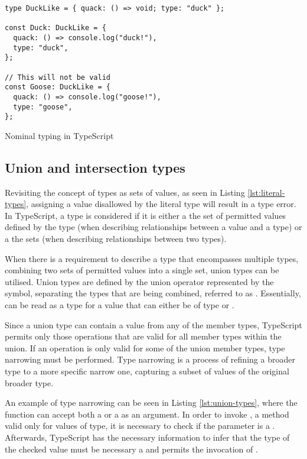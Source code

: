 \begin{listing}[ht]
  \begin{verbatim}
type DuckLike = { quack: () => void; type: "duck" };

const Duck: DuckLike = {
  quack: () => console.log("duck!"),
  type: "duck",
};

// This will not be valid
const Goose: DuckLike = {
  quack: () => console.log("goose!"),
  type: "goose",
};
\end{verbatim}
  \caption{Nominal typing in TypeScript}\label{lst:nominal-types-emulation}
\end{listing}

\subsection{Union and intersection types}\label{sec:union-intersection}

Revisiting the concept of types as sets of values, as seen in Listing \ref{lst:literal-types}, assigning a value disallowed by the literal type will result in a type error. In TypeScript, a type is considered  if it is either a  the set of permitted values defined by the type (when describing relationships between a value and a type) or a  the sets (when describing relationships between two types).

When there is a requirement to describe a type that encompasses multiple types, combining two sets of permitted values into a single set, union types can be utilised. Union types are defined by the union operator represented by the \code{|} symbol, separating the types that are being combined, referred to as  \cite{DocumentationEverydayTypes}. Essentially,  can be read as a type for a value that can either be of type  or .

Since a union type can contain a value from any of the member types, TypeScript permits only those operations that are valid for all member types within the union. If an operation is only valid for some of the union member types, type narrowing must be performed. Type narrowing is a process of refining a broader type to a more specific narrow one, capturing a subset of values of the original broader type.

An example of type narrowing can be seen in Listing \ref{lst:union-types}, where the function  can accept both a  or a  as an argument. In order to invoke , a method valid only for values of  type, it is necessary to check if the parameter is a . Afterwards, TypeScript has the necessary information to infer that the type of the checked value must be necessary a  and permits the invocation of .

